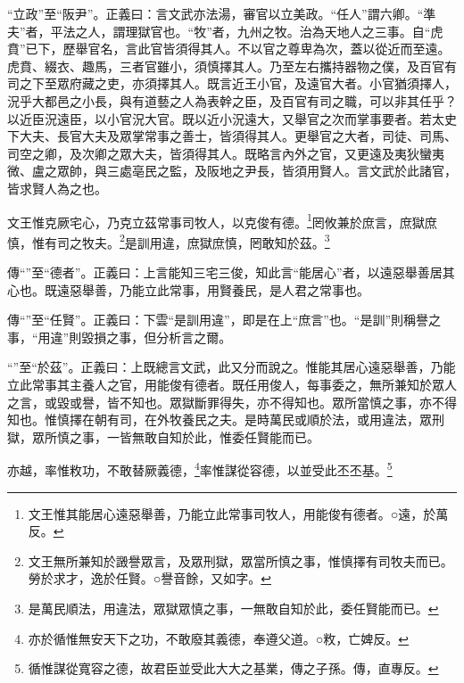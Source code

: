 {\noindent\shu{}\fzkt “立政”至“阪尹”。正義曰：言文武亦法湯，審官以立美政。“任人”謂六卿。“準夫”者，平法之人，謂理獄官也。“牧”者，九州之牧。治為天地人之三事。自“虎賁”已下，歷舉官名，言此官皆須得其人。不以官之尊卑為次，蓋以從近而至遠。虎賁、綴衣、趣馬，三者官雖小，須慎擇其人。乃至左右攜持器物之僕，及百官有司之下至眾府藏之吏，亦須擇其人。既言近王小官，及遠官大者。小官猶須擇人，況乎大都邑之小長，與有道藝之人為表幹之臣，及百官有司之職，可以非其任乎？以近臣況遠臣，以小官況大官。既以近小況遠大，又舉官之次而掌事要者。若太史下大夫、長官大夫及眾掌常事之善士，皆須得其人。更舉官之大者，司徒、司馬、司空之卿，及次卿之眾大夫，皆須得其人。既略言內外之官，又更遠及夷狄蠻夷微、盧之眾帥，與三處亳民之監，及阪地之尹長，皆須用賢人。言文武於此諸官，皆求賢人為之也。 \par}

文王惟克厥宅心，乃克立茲常事司牧人，以克俊有德。\footnote{文王惟其能居心遠惡舉善，乃能立此常事司牧人，用能俊有德者。○遠，於萬反。}罔攸兼於庶言，庶獄庶慎，惟有司之牧夫。\footnote{文王無所兼知於譭譽眾言，及眾刑獄，眾當所慎之事，惟慎擇有司牧夫而已。勞於求才，逸於任賢。○譽音餘，又如字。}是訓用違，庶獄庶慎，罔敢知於茲。\footnote{是萬民順法，用違法，眾獄眾慎之事，一無敢自知於此，委任賢能而已。}


{\noindent\zhuan{}\fzbyks 傳“”至“德者”。正義曰：上言能知三宅三俊，知此言“能居心”者，以遠惡舉善居其心也。既遠惡舉善，乃能立此常事，用賢養民，是人君之常事也。 \par}

{\noindent\zhuan{}\fzbyks 傳“”至“任賢”。正義曰：下雲“是訓用違”，即是在上“庶言”也。“是訓”則稱譽之事，“用違”則毀損之事，但分析言之爾。 \par}

{\noindent\shu{}\fzkt “”至“於茲”。正義曰：上既總言文武，此又分而說之。惟能其居心遠惡舉善，乃能立此常事其主養人之官，用能俊有德者。既任用俊人，每事委之，無所兼知於眾人之言，或毀或譽，皆不知也。眾獄斷罪得失，亦不得知也。眾所當慎之事，亦不得知也。惟慎擇在朝有司，在外牧養民之夫。是時萬民或順於法，或用違法，眾刑獄，眾所慎之事，一皆無敢自知於此，惟委任賢能而已。 \par}

亦越，率惟敉功，不敢替厥義德，\footnote{亦於循惟無安天下之功，不敢廢其義德，奉遵父道。○敉，亡婢反。}率惟謀從容德，以並受此丕丕基。\footnote{循惟謀從寬容之德，故君臣並受此大大之基業，傳之子孫。傳，直專反。}


